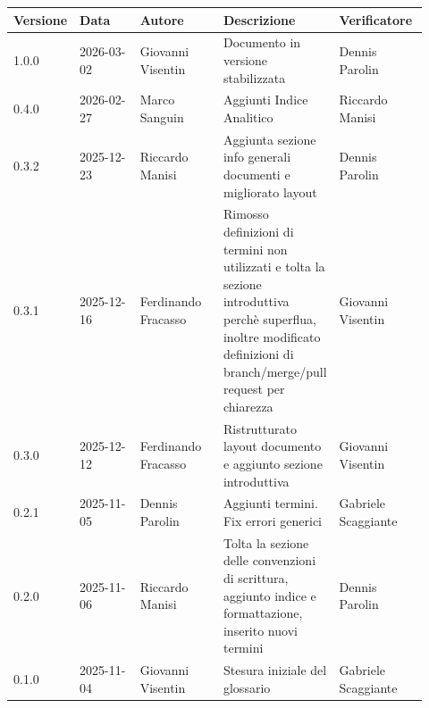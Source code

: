 \documentclass[a4paper,12pt]{article}
\begin{document}
\begin{center}
\small
\renewcommand{\arraystretch}{1.2} 
\begin{tabular}{|p{0.1\linewidth}|p{0.18\linewidth}|p{0.22\linewidth}|p{0.20\linewidth}|p{0.22\linewidth}|}
\hline
\rowcolor{gray!60} 
\textbf{Versione} & \textbf{Data} & \textbf{Autore} & \textbf{Descrizione} & \textbf{Verificatore} \\
\hline
\rowcolor{white}
1.0.0 & 2026-03-02 & Giovanni Visentin & Documento in versione stabilizzata & Dennis Parolin \\
\hline
\rowcolor{gray!20}
0.4.0 & 2026-02-27 & Marco Sanguin & Aggiunti Indice Analitico & Riccardo Manisi \\
\hline
\rowcolor{white}
0.3.2 & 2025-12-23 & Riccardo Manisi & Aggiunta sezione info generali documenti e migliorato layout & Dennis Parolin\\
\hline
\rowcolor{gray!20}
0.3.1 & 2025-12-16 & Ferdinando Fracasso & Rimosso definizioni di termini non utilizzati e tolta la sezione introduttiva perchè superflua, inoltre modificato definizioni di branch/merge/pull request per chiarezza & Giovanni Visentin\\
\hline
\rowcolor{white}
0.3.0 & 2025-12-12 & Ferdinando Fracasso & Ristrutturato layout documento e aggiunto sezione introduttiva & Giovanni Visentin\\
\hline
\rowcolor{gray!20}
0.2.1 & 2025-11-05 & Dennis Parolin & Aggiunti termini. Fix errori generici & Gabriele Scaggiante \\
\hline
\rowcolor{white}
0.2.0 & 2025-11-06 & Riccardo Manisi & Tolta la sezione delle convenzioni di scrittura, aggiunto indice e formattazione, inserito nuovi termini & Dennis Parolin \\
\hline
\rowcolor{gray!20}
0.1.0 & 2025-11-04 & Giovanni Visentin & Stesura iniziale del glossario & Gabriele Scaggiante \\
\hline
\end{tabular}
\end{center}

\clearpage

\tableofcontents
\thispagestyle{empty} %
\clearpage

\printindex
\clearpage

\end{document}
